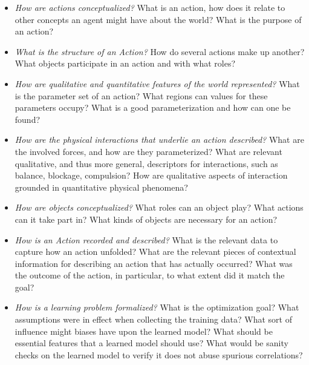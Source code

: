 \begin{itemize}
    \item \emph{How are actions conceptualized?} What is an action, how does it relate to other concepts an agent might have about the world? What is the purpose of an action?
    \item \emph{What is the structure of an Action?} How do several actions make up another? What objects participate in an action and with what roles?
    \item \emph{How are qualitative and quantitative features of the world represented?} What is the parameter set of an action? What regions can values for these parameters occupy? What is a good parameterization and how can one be found?
    \item \emph{How are the physical interactions that underlie an action described?} What are the involved forces, and how are they parameterized? What are relevant qualitative, and thus more general, descriptors for interactions, such as balance, blockage, compulsion? How are qualitative aspects of interaction grounded in quantitative physical phenomena?
    \item \emph{How are objects conceptualized?} What roles can an object play? What actions can it take part in? What kinds of objects are necessary for an action?
    \item \emph{How is an Action recorded and described?} What is the relevant data to capture how an action unfolded? What are the relevant pieces of contextual information for describing an action that has actually occurred? What was the outcome of the action, in particular, to what extent did it match the goal?
    \item \emph{How is a learning problem formalized?} What is the optimization goal? What assumptions were in effect when collecting the training data? What sort of influence might biases have upon the learned model? What should be essential features that a learned model should use? What would be sanity checks on the learned model to verify it does not abuse spurious correlations?
\end{itemize}



